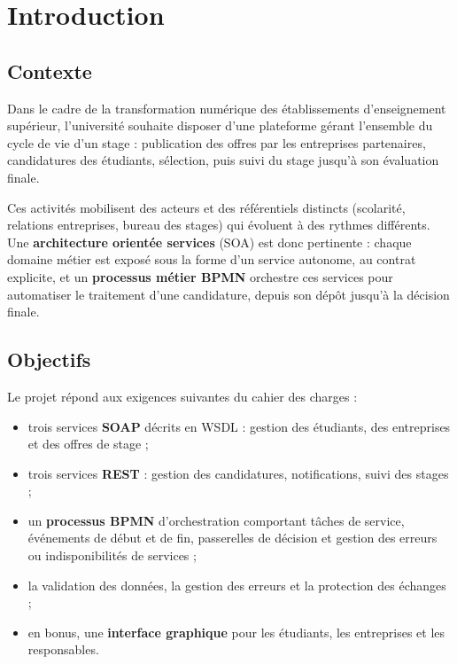 \chapter{Introduction}

\section{Contexte}
Dans le cadre de la transformation numérique des établissements d'enseignement supérieur, l'université souhaite
disposer d'une plateforme gérant l'ensemble du cycle de vie d'un stage : publication des offres par les entreprises
partenaires, candidatures des étudiants, sélection, puis suivi du stage jusqu'à son évaluation finale.

Ces activités mobilisent des acteurs et des référentiels distincts (scolarité, relations entreprises, bureau des
stages) qui évoluent à des rythmes différents. Une \textbf{architecture orientée services} (SOA) est donc pertinente :
chaque domaine métier est exposé sous la forme d'un service autonome, au contrat explicite, et un
\textbf{processus métier BPMN} orchestre ces services pour automatiser le traitement d'une candidature, depuis son
dépôt jusqu'à la décision finale.

\section{Objectifs}
Le projet répond aux exigences suivantes du cahier des charges :
\begin{itemize}
  \item trois services \textbf{SOAP} décrits en WSDL : gestion des étudiants, des entreprises et des offres de stage ;
  \item trois services \textbf{REST} : gestion des candidatures, notifications, suivi des stages ;
  \item un \textbf{processus BPMN} d'orchestration comportant tâches de service, événements de début et de fin,
        passerelles de décision et gestion des erreurs ou indisponibilités de services ;
  \item la validation des données, la gestion des erreurs et la protection des échanges ;
  \item en bonus, une \textbf{interface graphique} pour les étudiants, les entreprises et les responsables.
\end{itemize}

